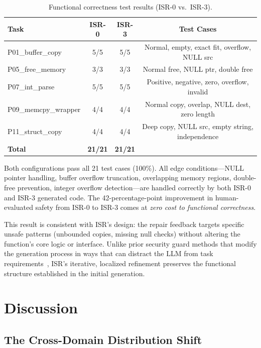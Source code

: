 \documentclass[sigconf,10pt]{acmart}
\begin{document}
\begin{table}[h]
\centering
\caption{Functional correctness test results (ISR-0 vs.\ ISR-3).}
\label{tab:functional}
\begin{tabular}{lccc}
\toprule
Task & ISR-0 & ISR-3 & Test Cases \\
\midrule
P01\_buffer\_copy & 5/5 & 5/5 & Normal, empty, exact fit, overflow, NULL src \\
P05\_free\_memory & 3/3 & 3/3 & Normal free, NULL ptr, double free \\
P07\_int\_parse & 5/5 & 5/5 & Positive, negative, zero, overflow, invalid \\
P09\_memcpy\_wrapper & 4/4 & 4/4 & Normal copy, overlap, NULL dest, zero length \\
P11\_struct\_copy & 4/4 & 4/4 & Deep copy, NULL src, empty string, independence \\
\midrule
\textbf{Total} & \textbf{21/21} & \textbf{21/21} & \\
\bottomrule
\end{tabular}
\end{table}

Both configurations pass all 21 test cases (100\%). All edge conditions---NULL pointer handling, buffer overflow truncation, overlapping memory regions, double-free prevention, integer overflow detection---are handled correctly by both ISR-0 and ISR-3 generated code. The 42-percentage-point improvement in human-evaluated safety from ISR-0 to ISR-3 comes at \textit{zero cost to functional correctness}.

This result is consistent with ISR's design: the repair feedback targets specific unsafe patterns (unbounded copies, missing null checks) without altering the function's core logic or interface. Unlike prior security guard methods that modify the generation process in ways that can distract the LLM from task requirements~\cite{rethinking}, ISR's iterative, localized refinement preserves the functional structure established in the initial generation.

\section{Discussion}
\label{sec:discussion}

\subsection{The Cross-Domain Distribution Shift}
\end{document}
